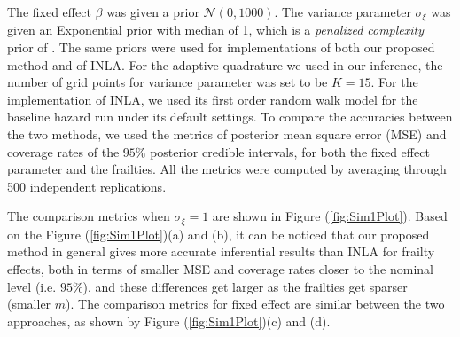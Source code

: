 \documentclass[ba]{imsart}
\begin{document}
The fixed effect $\beta$ was given a prior $\mathcal{N}(0,1000)$. The variance parameter $\sigma_\xi$ was given an Exponential prior with median of 1, which is a \emph{penalized complexity} prior of \cite{pcprior}. The same priors were used for implementations of both our proposed method and of INLA. For the adaptive quadrature we used in our inference, the number of grid points for variance parameter was set to be $K = 15$. For the implementation of INLA, we used its first order random walk model for the baseline hazard run under its default settings. To compare the accuracies between the two methods, we used the metrics of posterior mean square error (MSE) and coverage rates of the $95\%$ posterior credible intervals, for both the fixed effect parameter and the frailties. All the metrics were computed by averaging through 500 independent replications. 

The comparison metrics when $\sigma_\xi = 1$ are shown in Figure (\ref{fig:Sim1Plot}). Based on the Figure (\ref{fig:Sim1Plot})(a) and (b), it can be noticed that our proposed method in general gives more accurate inferential results than INLA for frailty effects, both in terms of smaller MSE and coverage rates closer to the nominal level (i.e. $95\%$), and these differences get larger as the frailties get sparser (smaller $m$). 
The comparison metrics for fixed effect are similar between the two approaches, as shown by Figure (\ref{fig:Sim1Plot})(c) and (d).
\end{document}
